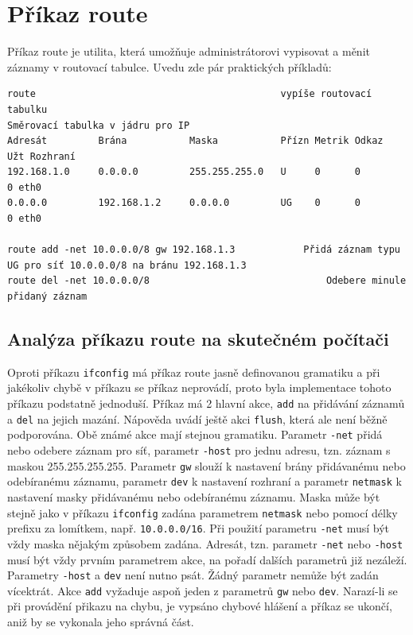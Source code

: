 
\section{Příkaz route}

Příkaz route je utilita, která umožňuje administrátorovi vypisovat a měnit záznamy v routovací tabulce. Uvedu zde pár praktických příkladů:
\begin{verbatim}
route											vypíše routovací tabulku
Směrovací tabulka v jádru pro IP
Adresát         Brána           Maska           Přízn Metrik Odkaz  Užt Rozhraní
192.168.1.0     0.0.0.0         255.255.255.0   U     0      0        0 eth0
0.0.0.0         192.168.1.2     0.0.0.0         UG    0      0        0 eth0

route add -net 10.0.0.0/8 gw 192.168.1.3			Přidá záznam typu UG pro síť 10.0.0.0/8 na bránu 192.168.1.3
route del -net 10.0.0.0/8								Odebere minule přidaný záznam
\end{verbatim}


\subsection{Analýza příkazu route na skutečném počítači}

Oproti příkazu \verb|ifconfig| má příkaz route jasně definovanou gramatiku a při jakékoliv chybě v příkazu se příkaz neprovádí, proto byla implementace tohoto příkazu podstatně jednoduší. Příkaz má 2 hlavní akce, \verb|add| na přidávání záznamů a \verb|del| na jejich mazání. Nápověda uvádí ještě akci \verb|flush|, která ale není běžně podporována. Obě známé akce mají stejnou gramatiku. Parametr \verb|-net| přidá nebo odebere záznam pro síť, parametr \verb|-host| pro jednu adresu, tzn. záznam s maskou 255.255.255.255. Parametr \verb|gw| slouží k nastavení brány přidávanému nebo odebíranému záznamu, parametr \verb|dev| k nastavení rozhraní a parametr \verb|netmask| k nastavení masky přidávanému nebo odebíranému záznamu. Maska může být stejně jako v příkazu \verb|ifconfig| zadána parametrem \verb|netmask| nebo pomocí délky prefixu za lomítkem, např. \verb|10.0.0.0/16|. Při použití parametru \verb|-net| musí být vždy maska nějakým způsobem zadána. Adresát, tzn. parametr \verb|-net| nebo \verb|-host| musí být vždy prvním parametrem akce, na pořadí dalších parametrů již nezáleží. Parametry \verb|-host| a \verb|dev| není nutno psát. Žádný parametr nemůže být zadán vícektrát. Akce \verb|add| vyžaduje aspoň jeden z parametrů \verb|gw| nebo \verb|dev|. Narazí-li se při provádění přikazu na chybu, je vypsáno chybové hlášení a příkaz se ukončí, aniž by se vykonala jeho správná část.


